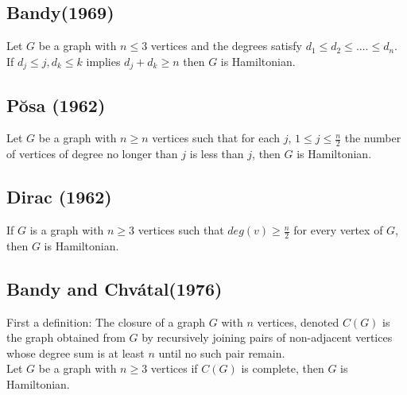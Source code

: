     \subsection{Bandy(1969)}
  Let $G$ be a graph with $n \leq 3$ vertices and the degrees satisfy $d_{1} \leq d_{2} \leq .... \leq d_{n}$. If $d_{j} \leq j, d_{k} \leq k$ implies $d_{j} + d_{k} \geq n$ then $G$ is Hamiltonian.
    
    \subsection{P\u{o}sa (1962)}
  Let $G$ be a graph with $n \geq n$ vertices such that for each $j$, $1 \leq j \leq \frac{n}{2}$ the number of vertices of degree no longer than $j$ is less than $j$, then $G$ is Hamiltonian.
    
    \subsection{Dirac (1962)}
  If $G$ is a graph with $n \geq 3$ vertices such that $deg(v) \geq \frac{n}{2}$ for every vertex of $G$, then $G$ is Hamiltonian.
    
    \subsection{Bandy and Chv\'{a}tal(1976)}
  First a definition: The closure of a graph $G$ with $n$ vertices, denoted $C(G)$ is the graph obtained from $G$ by recursively joining pairs of non-adjacent vertices whose degree sum is at least $n$ until no such pair remain.\\
    Let $G$ be a graph with $n \geq 3$ vertices if $C(G)$ is complete, then $G$ is Hamiltonian.



